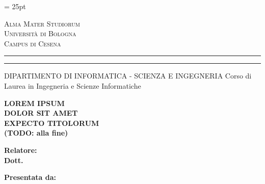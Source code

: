\oddsidemargin = 25pt

\begin{titlepage}
    \begin{center}
    {
        {\Large{\textsc{Alma Mater Studiorum}}} \\
        {\Large{\textsc{Università di Bologna}}} \\
        {\textsc{Campus di Cesena}}
        \vspace{-1mm}
    }
    \end{center}
    \begin{center}
    {
        \rule[0.1cm]{\textwidth}{0.1mm}
        \rule[0.5cm]{\textwidth}{0.6mm}
        DIPARTIMENTO DI INFORMATICA - SCIENZA E INGEGNERIA
        Corso di Laurea in Ingegneria e Scienze Informatiche
    }
    \end{center}

    \vspace{2.25cm} %

    \begin{center}
        {\LARGE{\textbf{LOREM IPSUM}}} \\
        \vspace{0.4cm}
        {\LARGE{\textbf{DOLOR SIT AMET}}} \\
        \vspace{0.4cm}
        {\LARGE{\textbf{EXPECTO TITOLORUM}}} \\
        \vspace{0.4cm}
        {\LARGE{\textbf{(TODO: alla fine)}}}
    \end{center}

    \vspace{2.25cm} %
    \par
    \noindent
    \begin{minipage}[t]{0.47\textwidth}
        {\large{\textbf{Relatore:}}} \\
        {\large{\textbf{Dott. \xsupervisor}}}
    \end{minipage}
    \hfill
    \begin{minipage}[t]{0.47\textwidth}\raggedleft
        {\large{\textbf{Presentata da:} \\
        {\large{\textbf{\xstudent}}}}}
    \end{minipage}


\end{titlepage}
